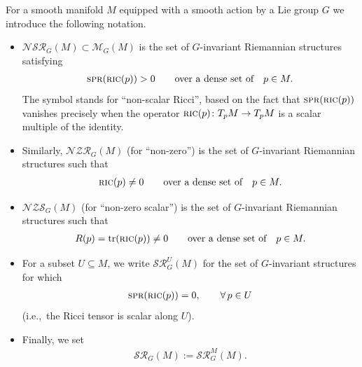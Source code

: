 \documentclass[pdftex]{sigma}%
\numberwithin{equation}{section}
\newcommand{\cat}[1]{\textsc{#1}}
\begin{document}
\begin{Notation}\label{not:ncr}
 For a smooth manifold $M$ equipped with a smooth action by a Lie group $G$ we introduce the following notation.
 \begin{itemize}\itemsep=0pt
 \item $\mathcal{NSR}_G(M)\subset \mathcal{M}_G(M)$ is the set of $G$-invariant Riemannian structures satisfying
 \begin{gather*}%
 \cat{spr}(\cat{ric}(p))>0 \qquad\text{over a dense set of}\quad p\in M.
 \end{gather*}
 The symbol stands for ``non-scalar Ricci'', based on the fact that $\cat{spr}(\cat{ric}(p))$ vanishes precisely when the operator $\cat{ric}(p)\colon T_pM\to T_pM$ is a scalar multiple of the identity.
 \item Similarly, $\mathcal{NZR}_G(M)$ (for ``non-zero'') is the set of $G$-invariant Riemannian structures such that
 \begin{gather*}
 \cat{ric}(p)\ne 0 \qquad\text{over a dense set of}\quad p\in M.
 \end{gather*}
 \item $\mathcal{NZS}_G(M)$ (for ``non-zero scalar'') is the set of $G$-invariant Riemannian structures such that
 \begin{gather*}
 R(p)=\mathrm{tr}(\cat{ric}(p))\ne 0 \qquad\text{over a dense set of}\quad p\in M.
 \end{gather*}
 \item For a subset $U\subseteq M$, we write $\mathcal{SR}^U_G(M)$ for the set of $G$-invariant structures for which
 \begin{gather*}
 \cat{spr}(\cat{ric}(p))=0,\qquad \forall\, p\in U
 \end{gather*}
 (i.e.,~the Ricci tensor is scalar along $U$).
 \item Finally, we set
 \begin{gather*}
 \mathcal{SR}_G(M):=\mathcal{SR}_G^M(M).
 \end{gather*}
 \end{itemize}
\end{Notation}
\end{document}
